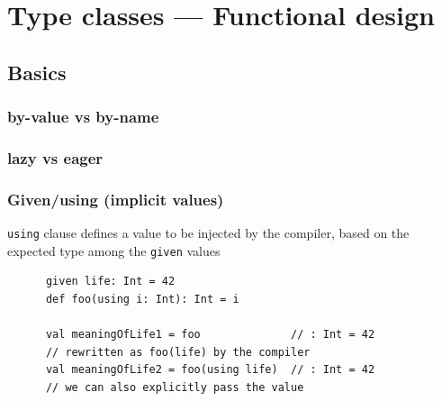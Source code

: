 \section{Type classes --- Functional design}
\subsection{Basics}

\begin{frame}
  \frametitle{by-value vs by-name}


\end{frame}

\begin{frame}
  \frametitle{lazy vs eager}


\end{frame}

\begin{frame}[fragile]
  \frametitle{Given/using (implicit values)}

  \texttt{using} clause defines a value to be injected by the compiler, based on the expected type among the \texttt{given} values

  \begin{example}
    \begin{lstlisting}
      given life: Int = 42
      def foo(using i: Int): Int = i
  
      val meaningOfLife1 = foo              // : Int = 42
      // rewritten as foo(life) by the compiler
      val meaningOfLife2 = foo(using life)  // : Int = 42
      // we can also explicitly pass the value
    \end{lstlisting}
  \end{example}
\end{frame}

